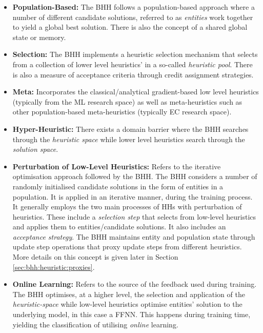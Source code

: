 \begin{itemize}
    \item \textbf{Population-Based:} The \ac{BHH} follows a population-based approach where a number of different candidate solutions, referred to as \textit{entities} work together to yield a global best solution. There is also the concept of a shared global state or memory.

    \item \textbf{Selection:} The \ac{BHH} implements a heuristic selection mechanism that selects from a collection of lower level heuristics' in a so-called \textit{heuristic pool}. There is also a measure of acceptance criteria through credit assignment strategies.
    
    \item \textbf{Meta:} Incorporates the classical/analytical gradient-based low level heuristics (typically from the \ac{ML} research space) as well as meta-heuristics such as other population-based meta-heuristics (typically \ac{EC} research space).
    
    \item \textbf{Hyper-Heuristic:} There exists a domain barrier where the \ac{BHH} searches through the \textit{heuristic space} while lower level heuristics search through the \textit{solution space}.
    
    \item \textbf{Perturbation of Low-Level Heuristics:} Refers to the iterative optimisation approach followed by the \ac{BHH}. The \ac{BHH} considers a number of randomly initialised candidate solutions in the form of entities in a population. It is applied in an iterative manner, during the training process. It generally employs the two main processes of \acp{HH} with perturbation of heuristics. These include a \textit{selection step} that selects from low-level heuristics and applies them to entities/candidate solutions. It also includes an \textit{acceptance strategy}. The \ac{BHH} maintains entity and population state through update step operations that proxy update steps from different heuristics. More details on this concept is given later in Section \ref{sec:bhh:heuristic:proxies}.
    
    \item \textbf{Online Learning:} Refers to the source of the feedback used during training. The \ac{BHH} optimises, at a higher level, the selection and application of the \textit{heuristic-space} while low-level heuristics optimise entities' solution to the underlying model, in this case a \ac{FFNN}. This happens during training time, yielding the classification of utilising \textit{online} learning.
\end{itemize}

